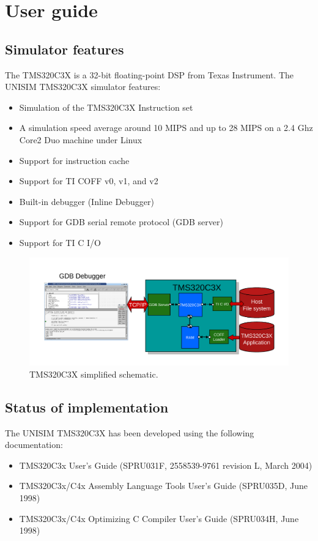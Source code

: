 \section{User guide}

\subsection{Simulator features}

The TMS320C3X is a 32-bit floating-point DSP from Texas Instrument.
The UNISIM TMS320C3X simulator features:
\begin{itemize}
\item Simulation of the TMS320C3X Instruction set
\item A simulation speed average around 10 MIPS and up to 28 MIPS on a 2.4 Ghz Core2 Duo machine under Linux
\item Support for instruction cache
\item Support for TI COFF v0, v1, and v2
\item Built-in debugger (Inline Debugger)
\item Support for GDB serial remote protocol (GDB server)
\item Support for TI C I/O
\end{itemize}

\begin{figure}[!h]
	\begin{center}
		\includegraphics[width=\textwidth]{tms320c3x/fig_tms320c3x.pdf}
	\end{center}
	\caption{TMS320C3X simplified schematic.}
	\label{fig:tms320c3x}
\end{figure}

\subsection{Status of implementation}

The UNISIM TMS320C3X has been developed using the following documentation:
\begin{itemize}
\item TMS320C3x User’s Guide (SPRU031F, 2558539-9761 revision L, March 2004)
\item TMS320C3x/C4x Assembly Language Tools User’s Guide (SPRU035D, June 1998)
\item TMS320C3x/C4x Optimizing C Compiler User’s Guide (SPRU034H, June 1998)
\end{itemize}

